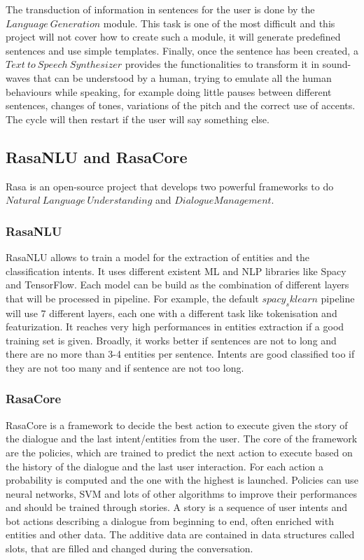 \documentclass[11pt,a4paper]{article}
\begin{document}
The transduction of information in sentences for the user is done by the $Language\ Generation$ module. This task is one of the most difficult and this project will not cover how to create such a module, it will generate predefined sentences and use simple templates.
Finally, once the sentence has been created, a $Text\ to\ Speech\ Synthesizer$ provides the functionalities to transform it in sound-waves that can be understood by a human, trying to emulate all the human behaviours while speaking, for example doing little pauses between different sentences, changes of tones, variations of the pitch and the correct use of accents. The cycle will then restart if the user will say something else.
 
\subsection{RasaNLU and RasaCore}

Rasa is an open-source project that develops two powerful frameworks to do $Natural\ Language\ Understanding$ and $Dialogue Management$. 

\subsubsection{RasaNLU}

RasaNLU allows to train a model for the extraction of entities and the classification intents. It uses different existent ML and NLP libraries like Spacy and TensorFlow. Each model can be build as the combination of different layers that will be processed in pipeline. For example, the default $spacy_sklearn$ pipeline will use 7 different layers, each one with a different task like tokenisation and featurization. It reaches very high performances in entities extraction if a good training set is given. Broadly, it works better if sentences are not to long and there are no more than 3-4 entities per sentence. Intents are good classified too if they are not too many and if sentence are not too long. 

\subsubsection{RasaCore}

RasaCore is a framework to decide the best action to execute given the story of the dialogue and the last intent/entities from the user. The core of the framework are the policies, which are trained to predict the next action to execute based on the history of the dialogue and the last user interaction. For each action a probability is computed and the one with the highest is launched. Policies can use neural networks, SVM and lots of other algorithms to improve their performances and should be trained through stories. A story is a sequence of user intents and bot actions describing a dialogue from beginning to end, often enriched with entities and other data. The additive data are contained in data structures called slots, that are filled and changed during the conversation.
\end{document}
